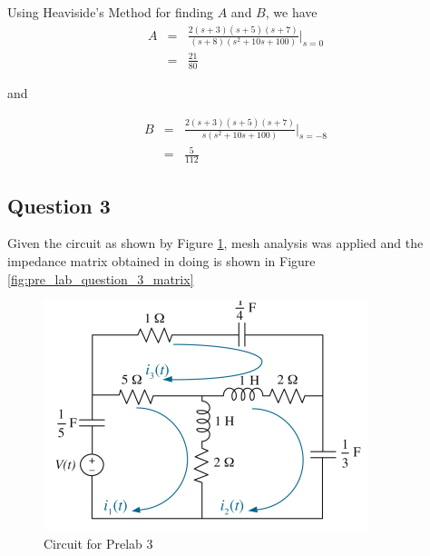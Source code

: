 \documentclass[12pt, a4paper]{article}
\begin{document}
		Using Heaviside's Method for finding $A$ and $B$, we have
		\[
			\begin{array}{rcl}
				A & = & \frac{2(s+3)(s+5)(s+7)}{(s+8)(s^2 + 10s + 100)}\bigg\rvert_{s=0} \\
				& = & \frac{21}{80}
			\end{array}
		\]

		and

		\[
			\begin{array}{rcl}
				B & = & \frac{2(s+3)(s+5)(s+7)}{s(s^2 + 10s + 100)}\bigg\rvert_{s=-8} \\
				& = & \frac{5}{112}
			\end{array}
		\]

	\subsection*{Question 3} %
	\label{sub:question_3}
	Given the circuit as shown by Figure \ref{fig:circuit}, mesh analysis was applied and the impedance matrix obtained in doing is shown in Figure \ref{fig:pre_lab_question_3_matrix}


	\begin{figure}[H]
		\centering
		\includegraphics[width=\textwidth]{circuit}
		\caption{Circuit for Prelab 3}
		\label{fig:circuit}
	\end{figure}
\end{document}
